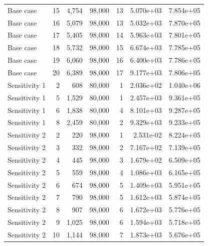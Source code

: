 \begin{table}[]
\begin{tabular}{lrrrrrr}
         Base case &   15 & 4,754 &             98,000 &                  13 & 5.070e+03 & 7.854e+05 \\
         Base case &   16 & 5,079 &             98,000 &                  13 & 5.032e+03 & 7.870e+05 \\
         Base case &   17 & 5,405 &             98,000 &                  14 & 5.963e+03 & 7.801e+05 \\
         Base case &   18 & 5,732 &             98,000 &                  15 & 6.674e+03 & 7.785e+05 \\
         Base case &   19 & 6,060 &             98,000 &                  16 & 6.400e+03 & 7.786e+05 \\
         Base case &   20 & 6,389 &             98,000 &                  17 & 9.177e+03 & 7.806e+05 \\
     Sensitivity 1 &    2 &   608 &             80,000 &                   1 & 2.036e+02 & 1.040e+06 \\
     Sensitivity 1 &    5 & 1,529 &             80,000 &                   1 & 2.457e+03 & 9.361e+05 \\
     Sensitivity 1 &    6 & 1,838 &             80,000 &                   4 & 8.101e+03 & 9.287e+05 \\
     Sensitivity 1 &    8 & 2,459 &             80,000 &                   2 & 9.329e+03 & 9.233e+05 \\
     Sensitivity 2 &    2 &   220 &             98,000 &                   1 & 2.531e-02 & 8.224e+05 \\
     Sensitivity 2 &    3 &   332 &             98,000 &                   2 & 7.167e+02 & 7.139e+05 \\
     Sensitivity 2 &    4 &   445 &             98,000 &                   3 & 1.679e+02 & 6.509e+05 \\
     Sensitivity 2 &    5 &   559 &             98,000 &                   4 & 1.086e+03 & 6.165e+05 \\
     Sensitivity 2 &    6 &   674 &             98,000 &                   5 & 1.409e+03 & 5.951e+05 \\
     Sensitivity 2 &    7 &   790 &             98,000 &                   5 & 1.612e+03 & 5.874e+05 \\
     Sensitivity 2 &    8 &   907 &             98,000 &                   6 & 1.672e+03 & 5.776e+05 \\
     Sensitivity 2 &    9 & 1,025 &             98,000 &                   6 & 1.594e+03 & 5.718e+05 \\
     Sensitivity 2 &   10 & 1,144 &             98,000 &                   7 & 1.873e+03 & 5.676e+05 \\

\end{tabular}
\end{table}
